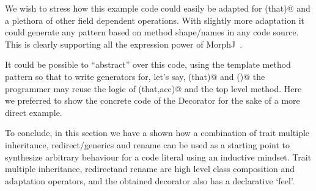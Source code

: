We wish to stress how this example code could easily be adapted for \Q@equals(that)@ and
a plethora of other field dependent operations.
With slightly more adaptation it could generate any pattern based on method shape/names in
any code source.
This is clearly supporting all the expression power of MorphJ~\cite{huang2008expressive}.

It could be possible to ``abstract'' over this code, using the template method pattern so that
to write generators for, let's say, \Q@equals(that)@ and \Q@toS()@ the programmer may reuse the logic of \Q@fold(that,acc)@ and the top level method.
Here we preferred to show the concrete code of the Decorator \Q@Stringable@ for the sake of a more
direct example.

To conclude, in this section we have a shown how a combination of
trait multiple inheritance, redirect/generics and rename
can be used as a starting point to synthesize arbitrary behaviour for a
code literal using an inductive mindset.
Trait multiple inheritance, redirectand rename
are high level class composition and adaptation operators,
and the obtained decorator also has a declarative `feel'.




